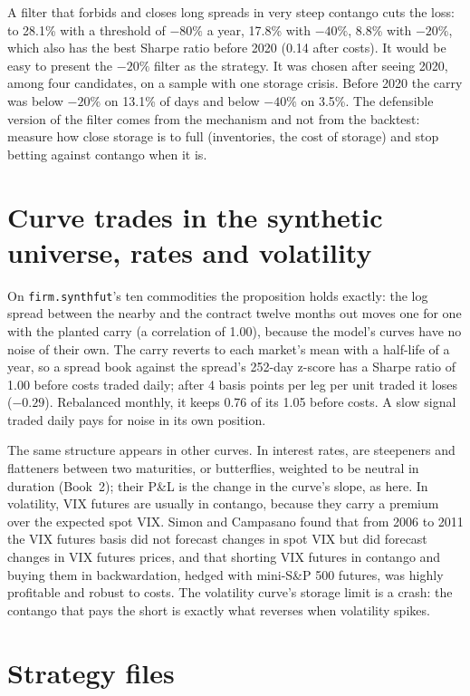 A filter that forbids and closes long spreads in very steep contango cuts the loss: to 28.1\% with a threshold of $-80\%$ a year, 17.8\% with $-40\%$,
8.8\% with $-20\%$, which also has the best Sharpe ratio before 2020 (0.14 after costs). It would be easy to present the $-20\%$ filter as the
strategy. It was chosen after seeing 2020, among four candidates, on a sample with one storage crisis. Before 2020 the carry was below $-20\%$ on
13.1\% of days and below $-40\%$ on 3.5\%. The defensible version of the filter comes from the mechanism and not from the backtest: measure how close
storage is to full (inventories, the cost of storage) and stop betting against contango when it is.

\section{Curve trades in the synthetic universe, rates and volatility}

On \texttt{firm.synthfut}'s ten commodities the proposition holds exactly: the log spread between the nearby and the contract twelve months out moves
one for one with the planted carry (a correlation of 1.00), because the model's curves have no noise of their own. The carry reverts to each market's
mean with a half-life of a year, so a spread book against the spread's 252-day z-score has a Sharpe ratio of 1.00 before costs traded daily; after 4
basis points per leg per unit traded it loses ($-0.29$). Rebalanced monthly, it keeps 0.76 of its 1.05 before costs. A slow signal traded daily pays for
noise in its own position.

The same structure appears in other curves. In interest rates,  are steepeners and flatteners between two maturities, or butterflies,
weighted to be neutral in duration (Book~2); their P\&L is the change in the curve's slope, as here. In volatility, VIX futures are usually in contango,
because they carry a premium over the expected spot VIX. Simon and Campasano found that from 2006 to 2011 the VIX futures basis did not forecast
changes in spot VIX but did forecast changes in VIX futures prices, and that shorting VIX futures in contango and buying them in backwardation, hedged
with mini-S\&P 500 futures, was highly profitable and robust to costs. The volatility curve's storage limit is a crash: the contango that pays the short
is exactly what reverses when volatility spikes.

\section{Strategy files}

